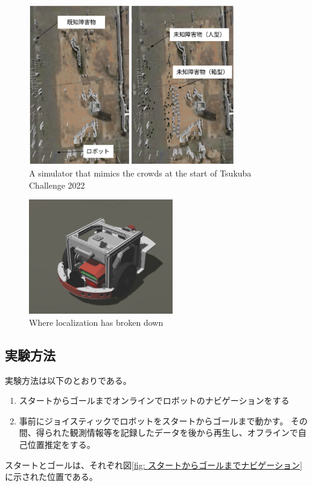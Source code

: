 \documentclass{jarticle}
\begin{document}
\begin{figure}[htbp]
  \centering
   \includegraphics[height=70mm]{fig/environment_comparison.png}
   \vspace*{-4mm}
   \caption{A simulator that mimics the crowds at the start of Tsukuba Challenge 2022}
   \label{fig: つくばチャレンジ人混みシミュレータ}
\end{figure}

\begin{figure}[htbp]
  \centering
   \includegraphics[height=50mm]{fig/raspicat_gazebo.png}
   \vspace*{-4mm}
   \caption{Where localization has broken down}
   \label{fig: raspicat}
\end{figure}

\subsection{実験方法}

実験方法は以下のとおりである。
\noindent
\begin{enumerate}[A]
  \item スタートからゴールまでオンラインでロボットのナビゲーションをする
  \item 事前にジョイスティックでロボットをスタートからゴールまで動かす。
        その間、得られた観測情報等を記録したデータを後から再生し、オフラインで自己位置推定をする。
\end{enumerate}
\noindent
スタートとゴールは、それぞれ図\ref{fig: スタートからゴールまでナビゲーション}
に示された位置である。
\end{document}
